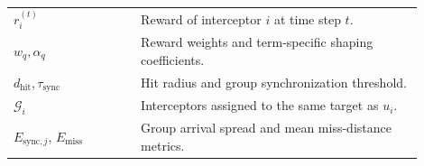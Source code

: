 \documentclass[lettersize,journal]{IEEEtran}
\begin{document}
{\begin{table}[!t]
\begin{tabular}{p{0.28\linewidth}p{0.62\linewidth}}
$r_i^{(t)}$ & Reward of interceptor $i$ at time step $t$. \\
$w_q,\alpha_q$ & Reward weights and term-specific shaping coefficients. \\
$d_{\mathrm{hit}},\tau_{\mathrm{sync}}$ & Hit radius and group synchronization threshold. \\
$\mathcal{G}_i$ & Interceptors assigned to the same target as $u_i$. \\
$E_{\mathrm{sync},j}$, $E_{\mathrm{miss}}$ & Group arrival spread and mean miss-distance metrics. \\
\bottomrule
\end{tabular}
\end{table}
}
\end{document}
